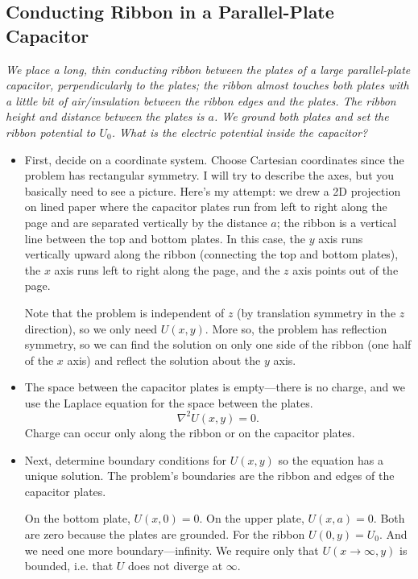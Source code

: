 \documentclass[11pt, a4paper]{article}
\renewcommand{\laplacian}{\nabla^{2}}
\begin{document}
\subsection{Conducting Ribbon in a Parallel-Plate Capacitor}
\textit{We place a long, thin conducting ribbon between the plates of a large parallel-plate capacitor, perpendicularly to the plates; the ribbon almost touches both plates with a little bit of air/insulation between the ribbon edges and the plates. The ribbon height and distance between the plates is $ a $. We ground both plates and set the ribbon potential to $ U_{0} $. What is the electric potential inside the capacitor?}

\begin{itemize}
	\item First, decide on a coordinate system. Choose Cartesian coordinates since the problem has rectangular symmetry. I will try to describe the axes, but you basically need to see a picture. Here's my attempt: we drew a 2D projection on lined paper where the capacitor plates run from left to right along the page and are separated vertically by the distance $ a $; the ribbon is a vertical line between the top and bottom plates. In this case, the $ y $ axis runs vertically upward along the ribbon (connecting the top and bottom plates), the $ x $ axis runs left to right along the page, and the $ z $ axis points out of the page. 
	
	Note that the problem is independent of $ z $ (by translation symmetry in the $ z $ direction), so we only need $ U(x, y) $. More so, the problem has reflection symmetry, so we can find the solution on only one side of the ribbon (one half of the $ x $ axis) and reflect the solution about the $ y $ axis.
	
	\item The space between the capacitor plates is empty---there is no charge, and we use the Laplace equation for the space between the plates.
	\begin{equation*}
		\laplacian U(x, y) = 0.
	\end{equation*}
	Charge can occur only along the ribbon or on the capacitor plates.
	
	\item Next, determine boundary conditions for $ U(x, y) $ so the equation has a unique solution. The problem's boundaries are the ribbon and edges of the capacitor plates.
	
	On the bottom plate, $ U(x, 0) = 0 $. On the upper plate, $ U(x, a) = 0 $. Both are zero because the plates are grounded. For the ribbon $ U(0, y) = U_{0} $. And we need one more boundary---infinity. We require only that $ U(x \to \infty, y) $ is bounded, i.e. that $ U $ does not diverge at $ \infty $. 
	

\end{itemize}
\end{document}
